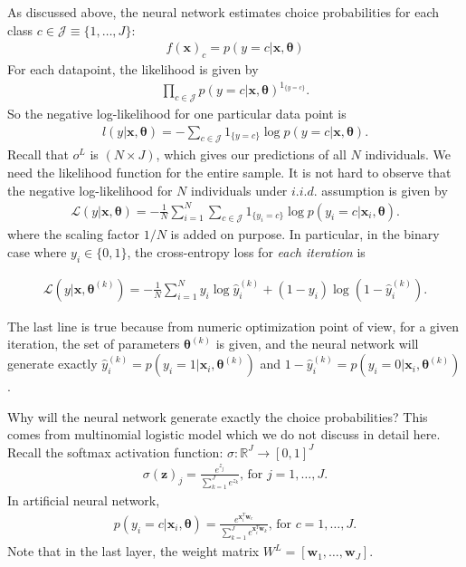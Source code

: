 \documentclass[letterpaper,12pt]{article}
\begin{document}
As discussed above, the neural network estimates choice probabilities for each class $c\in\mathcal{J}\equiv\{1,\dots,J\}$:  
\begin{align}
f(\boldsymbol{x})_c = p\left(y=c\vert \boldsymbol{x},\boldsymbol{\theta}\right)
\end{align}
For each datapoint, the likelihood is given by
\begin{align}
 \prod_{c\in\mathcal{J}}p\left(y=c\vert \boldsymbol{x},\boldsymbol{\theta}\right)^{1_{ \{y=c\} }}.
\end{align}
So the negative log-likelihood for one particular data point is 
\begin{align}
l(y\vert \boldsymbol{x},\boldsymbol{\theta}) = -\sum_{c\in\mathcal{J}} 1_{ \{y=c\} } \log p\left(y=c\vert \boldsymbol{x},\boldsymbol{\theta}\right).
\end{align}
Recall that $o^L$ is $(N\times J)$, which gives our predictions of all $N$ individuals. We need the likelihood function for the entire sample. It is not hard to observe that the negative log-likelihood for $N$ individuals under $i.i.d.$ assumption is given by 
\begin{align}
\mathcal{L}(y\vert \boldsymbol{x},\boldsymbol{\theta}) = -\frac{1}{N}\sum_{i=1}^{N}\sum_{c\in\mathcal{J}} 1_{ \{y_i=c\} } \log p\left(y_i=c\vert \boldsymbol{x}_i,\boldsymbol{\theta}\right).
\end{align}
where the scaling factor $1/N$ is added on purpose. In particular, in the binary case where $y_i\in\{0,1\}$, the cross-entropy loss for \textit{each iteration} is
\begin{tcolorbox}
\begin{align}
\mathcal{L}(y\vert \boldsymbol{x},\boldsymbol{\theta}^{(k)}) = -\frac{1}{N}\sum_{i=1}^{N} y_i\log \hat{y}_i^{(k)} + (1-y_i)\log (1-\hat{y}_i^{(k)}).
\end{align}
\end{tcolorbox}
The last line is true because from numeric optimization point of view, for a given iteration, the set of parameters $\boldsymbol{\theta}^{(k)}$ is given, and the neural network will generate exactly $\hat{y}_i^{(k)}=p\left(y_i=1\vert \boldsymbol{x}_i,\boldsymbol{\theta}^{(k)}\right)$ and $1-\hat{y}_i^{(k)}=p\left(y_i=0\vert \boldsymbol{x}_i,\boldsymbol{\theta}^{(k)}\right)$.

Why will the neural network generate exactly the choice probabilities? This comes from multinomial logistic model which we do not discuss in detail here. Recall the softmax activation function: $\sigma:\mathbb{R}^J\to[0,1]^J$
\begin{align}
\sigma(\boldsymbol{z})_j = \frac{e^{z_j}}{\sum_{k=1}^{J}e^{z_k}} \text{, for }j=1,\dots,J.
\end{align}
In artificial neural network, 
\begin{align}
p(y_i=c\vert\boldsymbol{x}_i,\boldsymbol{\theta}) = \frac{e^{\boldsymbol{x}_i^T\boldsymbol{w}_c}}{\sum_{k=1}^{J}e^{\boldsymbol{x}_i^T\boldsymbol{w}_k}} \text{, for }c=1,\dots,J.
\end{align}
Note that in the last layer, the weight matrix $W^L=[\boldsymbol{w}_1,\dots,\boldsymbol{w}_J]$.
\end{document}
